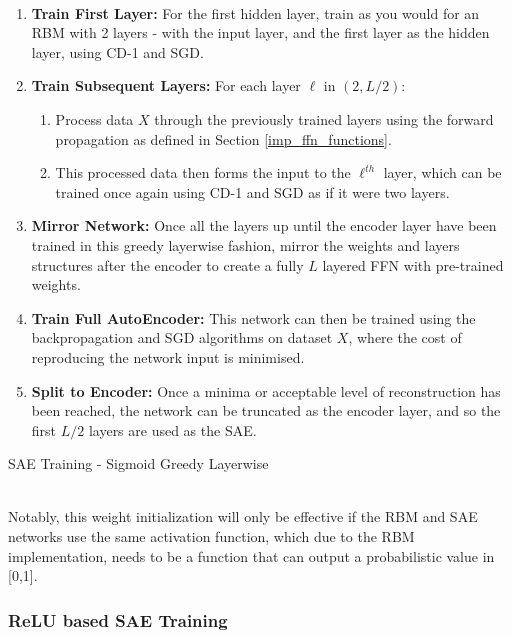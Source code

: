 \documentclass[a4paper,11pt,oneside]{article}
\theoremstyle{plain}
\theoremstyle{definition}
\begin{document}
	\begin{algorithm}[H]
		\texttt{\\}
		
		\begin{enumerate}
		\item \textbf{Train First Layer:} For the first hidden layer, train as you would for an RBM with 2 layers - with the input layer, and the first layer as the hidden layer, using CD-1 and SGD.
		\item \textbf{Train Subsequent Layers:} For each layer $\ell$ in $(2, L/2)$:
		\begin{enumerate}
			\item Process data $X$ through the previously trained layers using the forward propagation as defined in Section \ref{imp_ffn_functions}.
			\item This processed data then forms the input to the $\ell^{th}$ layer, which can be trained once again using CD-1 and SGD as if it were two layers.
		\end{enumerate}
		\item \textbf{Mirror Network:} Once all the layers up until the encoder layer have been trained in this greedy layerwise fashion, mirror the weights and layers structures after the encoder to create a fully $L$ layered FFN with pre-trained weights.
		\item \textbf{Train Full AutoEncoder:} This network can then be trained using the backpropagation and SGD algorithms on dataset $X$, where the cost of reproducing the network input is minimised.
		\item \textbf{Split to Encoder:} Once a minima or acceptable level of reconstruction has been reached, the network can be truncated as the encoder layer, and so the first $L/2$ layers are used as the SAE.
	\end{enumerate}
		
		\label{algo_sae_rbm}
		\caption{SAE Training - Sigmoid Greedy Layerwise}
	\end{algorithm}
	~\\
	 Notably, this weight initialization will only be effective if the RBM and SAE networks use the same activation function, which due to the RBM implementation, needs to be a function that can output a probabilistic value in [0,1].
	
	\subsubsection{ReLU based SAE Training}\label{imp_relusae}
	
\end{document}
